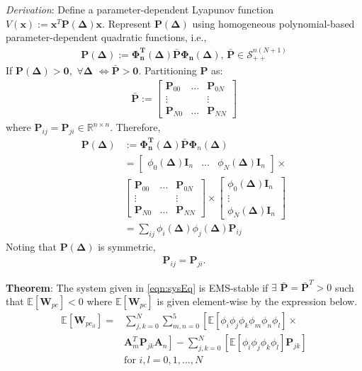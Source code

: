 \documentclass[letterpaper, 10 pt, conference]{ieeeconf}  %
\newcommand{\real}{\mathbb{R}}
\newcommand{\vo}[1]{\boldsymbol{#1}}
\newcommand{\Del}{\vo{\Delta}}
\begin{document}
\textit{Derivation}:
Define a parameter-dependent Lyapunov function $V(\vo{x}) := \vo{x}^T \vo{P}(\Del) \vo{x}$.
Represent $\vo{P(\Delta)}$ using homogeneous polynomial-based parameter-dependent quadratic functions, i.e.,
\begin{align}
	\vo{P(\Delta)} := {\vo{\Phi_n^T (\Delta)}} \bar{\vo{P}} \vo{\Phi_n (\Delta)}, \, \bar{\vo{P}} \in \mathcal{S}_{++}^{n(N+1)}
\end{align}
If $\vo{P}(\Del) > \vo{0},$ $\forall\Del $ $\iff \bar{\vo{P}} > \vo{0}$. Partitioning $\vo{P}$ as:
\begin{align*}
  \bar{\vo{P}} := \begin{bmatrix}
    \vo{P}_{00} & \hdots  & \vo{P}_{0N} \\
    \vdots & {} & \vdots \\
    \vo{P}_{N0} & \hdots  & \vo{P}_{NN}
\end{bmatrix}
\end{align*}
where $\vo{P}_{ij} = \vo{P}_{ji} \in \real^{n \times n}$. Therefore,
\begin{align}
  \vo{P(\Delta)} &:= {\vo{\Phi_n^T (\Delta)}} \bar{\vo{P}} \vo{\Phi}_n (\Del) \nonumber \\
  &= \begin{bmatrix}
    \phi_0(\Del)\vo{I}_n & \hdots & \phi_N  (\Del)  \vo{I}_n
\end{bmatrix} \times \nonumber \\
& \begin{bmatrix}
  \vo{P}_{00} & \hdots  & \vo{P}_{0N} \\
  \vdots & {} & \vdots \\
  \vo{P}_{N0} & \hdots  & \vo{P}_{NN}
\end{bmatrix} \times \begin{bmatrix}
  \phi_0(\Del)\vo{I}_n \\ \vdots \\ \phi_N  (\Del)  \vo{I}_n
\end{bmatrix} \nonumber \\
&= \sum_{ij} \phi_i (\Del) \phi_j (\Del) \vo{P}_{ij}
\end{align}
Noting that $\vo{P}(\Del)$ is symmetric,
\begin{align*}
  \vo{P}_{ij} = \vo{P}_{ji}.
\end{align*}

\textbf{Theorem}:
The system given in \eqref{eqn:sysEq} is EMS-stable if $\exists$ $\vo{\bar{P}} = \vo{\bar{P}}^T > 0$ such that $\mathbb{E} [\vo{W}_{pc}] < 0$ where $\mathbb{E} [\vo{W}_{pc}]$ is given element-wise by the expression below.
\begin{align}
        \mathbb{E} [\vo{W}_{pc_{il}}] = &\sum_{j,k = 0}^{N} \sum_{m,n = 0}^{5} \left[ \mathbb{E}[\phi_i \phi_j \phi_k \phi_m \phi_n \phi_l] \times \right. \nonumber\\
         & \left. \vo{A}_m^T \vo{P}_{jk} \vo{A}_n \right] %
        - \sum_{j,k = 0}^{N} \left[ \mathbb{E}[\phi_i \phi_j \phi_k \phi_l] \vo{P}_{jk} \right] \nonumber\\
        &\textrm{for } i, l=0,1,\hdots,N
  \label{eqn:stab}
\end{align}
\end{document}
